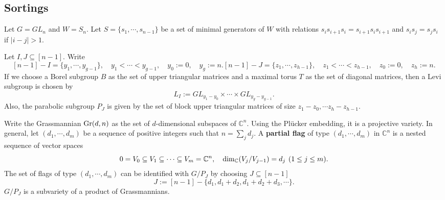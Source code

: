 \documentclass[12pt]{amsart}
\theoremstyle{definition}
\theoremstyle{remark}
\newcommand{\C}{\mathbb{C}}
\newcommand{\hsp}{\hspace{0.2em}}
\begin{document}
\subsection{Sortings} 

Let $G = GL_n$ and $W=S_n$. Let $S= \{ s_1 , \cdots , s_{n-1}\}$ be a set of minimal generators of $W$ with relations $s_i s_{i+1} s_i = s_{i+1} s_i s_{i+1}$ and $s_i s_j = s_j s_i$ if $|i-j| >1$.

Let $I,J \subseteq [n-1]$. Write
\begin{subequations}\label{eqn1.8}
\begin{equation}
[n-1]-I = \{ y_1 , \cdots , y_{g-1}\}, \quad y_1 < \cdots < y_{g-1}, \quad y_0:=0, \quad y_g:=n.
\end{equation}
\begin{equation}
[n-1]-J = \{ z_1 , \cdots , z_{h-1}\}, \quad z_1 < \cdots < z_{h-1}, \quad z_0:=0, \quad z_h:=n.
\end{equation}
\end{subequations}
If we choose a Borel subgroup $B$ as the set of upper triangular matrices and a maximal torus $T$ as the set of diagonal matrices, then a Levi subgroup is chosen by
\begin{equation}\label{eqn1.2}
L_I:= GL_{y_1 - y_0} \times \cdots \times GL_{y_{g} - y_{g-1}}.
\end{equation}
Also, the parabolic subgroup $P_J$ is given by the set of block upper triangular matrices of size $z_1 - z_0 , \cdots z_{h} - z_{h-1}$. 

Write the Grassmannian ${\rm Gr}(d,n)$ as the set of $d$-dimensional subspaces of $\C^n$. Using the Pl{\" u}cker embedding, it is a projective variety. In general, let $(d_1 , \cdots , d_m)$ be a sequence of positive integers such that $n = \sum_j d_j$. A \textbf{partial flag} of type $(d_1 , \cdots , d_m)$ in $\C^n$ is a nested sequence of vector spaces
\begin{equation}
0 = V_0 \subseteq V_1 \subseteq \cdots \subseteq V_m = \C^n, \quad {\rm dim}_{\C} (V_j / V_{j-1}) = d_j \hsp \hsp (1 \leq j \leq m).
\end{equation}
The set of flags of type $(d_1 , \cdots , d_m)$ can be identified with $G/ P_J$ by choosing $J \subseteq [n-1]$
\begin{equation}
J := [n-1] - \{ d_1 , d_1 + d_2 , d_1+d_2+d_3 , \cdots \}.
\end{equation}
$G/P_J$ is a subvariety of a product of Grassmannians.
\end{document}
